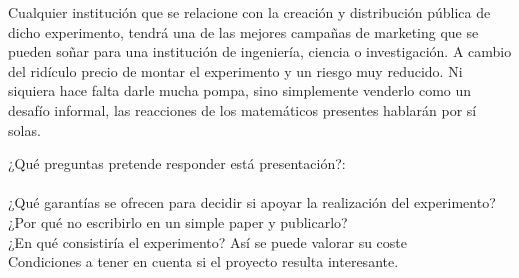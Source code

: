 \noindent
Cualquier institución que se relacione con la creación y distribución pública de dicho experimento, tendrá una de las mejores campañas de marketing que se pueden soñar para una institución de ingeniería, ciencia o investigación. A cambio del ridículo precio de montar el experimento y un riesgo muy reducido. Ni siquiera hace falta darle mucha pompa, sino simplemente venderlo como un desafío informal, las reacciones de los matemáticos presentes hablarán por sí solas.

\newpage
\noindent
¿Qué preguntas pretende responder está presentación?:\\\\
¿Qué garantías se ofrecen para decidir si apoyar la realización del experimento?\\
¿Por qué no escribirlo en un simple paper y publicarlo?\\
¿En qué consistiría el experimento? Así se puede valorar su coste\\
Condiciones a tener en cuenta si el proyecto resulta interesante.
